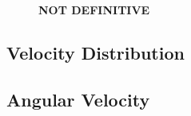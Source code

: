 \documentclass[../../master_thesis_np.tex]{subfiles}
\begin{document}
\begin{figure}[htp]
			
			\caption{\textbf{NOT DEFINITIVE}  }
			\label{fig:lj_velocity_cluster}
		\end{figure}
		

	
	\subsection{Velocity Distribution}
	\subsection{Angular Velocity}
	
		
\end{document}
